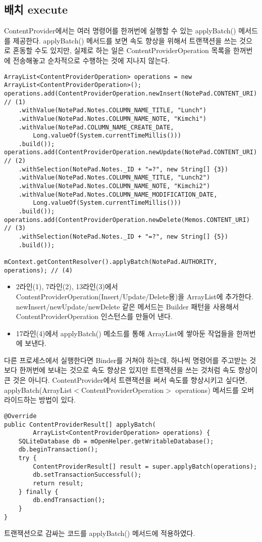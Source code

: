 \subsection{배치 execute}
ContentProvider에서는 여러 명령어를 한꺼번에 실행할 수 있는 applyBatch() 메서드를  제공한다. 
applyBatch() 메서드를 보면 속도 향상을 위해서 트랜잭션을 쓰는 것으로 혼동할 수도 있지만, 실제로 하는 일은 ContentProviderOperation 목록을 한꺼번에 전송해놓고 순차적으로 수행하는 것에 지나지 않는다. 
\begin{lstlisting}[frame=single] 
ArrayList<ContentProviderOperation> operations = new ArrayList<ContentProviderOperation>();
operations.add(ContentProviderOperation.newInsert(NotePad.CONTENT_URI) // (1)
	.withValue(NotePad.Notes.COLUMN_NAME_TITLE, "Lunch")
	.withValue(NotePad.Notes.COLUMN_NAME_NOTE, "Kimchi")
	.withValue(NotePad.COLUMN_NAME_CREATE_DATE, 
		Long.valueOf(System.currentTimeMillis()))
	.build());
operations.add(ContentProviderOperation.newUpdate(NotePad.CONTENT_URI) // (2)
	.withSelection(NotePad.Notes._ID + "=?", new String[] {3})
	.withValue(NotePad.Notes.COLUMN_NAME_TITLE, "Lunch2")
	.withValue(NotePad.Notes.COLUMN_NAME_NOTE, "Kimchi2")
	.withValue(NotePad.Notes.COLUMN_NAME_MODIFICATION_DATE, 
		Long.valueOf(System.currentTimeMillis()))
	.build());
operations.add(ContentProviderOperation.newDelete(Memos.CONTENT_URI) // (3)
	.withSelection(NotePad.Notes._ID + "=?", new String[] {5})
	.build());

mContext.getContentResolver().applyBatch(NotePad.AUTHORITY, operations); // (4)
\end{lstlisting}
\begin{itemize}
\item 2라인(1), 7라인(2), 13라인(3)에서 ContentProviderOperation(Insert/Update/Delete용)을 ArrayList에 추가한다. newInsert/newUpdate/newDelete 같은 메서드는 Builder 패턴을 사용해서 ContentProviderOperation 인스턴스를 만들어 낸다.
\item 17라인(4)에서 applyBatch() 메소드를 통해 ArrayList에 쌓아둔 작업들을 한꺼번에 보낸다.
\end{itemize}

다른 프로세스에서 실행한다면 Binder를 거쳐야 하는데, 하나씩 명령어를 주고받는 것보다 한꺼번에 보내는 것으로 속도 향상은 있지만 트랜잭션을 쓰는 것처럼 속도 향상이 큰 것은 아니다.
ContentProvider에서 트랜잭션을 써서 속도를 향상시키고 싶다면,
applyBatch(ArrayList$<$ContentProviderOperation$>$ operations) 메서드를 오버라이드하는 방법이 있다.
\begin{lstlisting}[frame=single] 
@Override
public ContentProviderResult[] applyBatch(
		ArrayList<ContentProviderOperation> operations) {
	SQLiteDatabase db = mOpenHelper.getWritableDatabase();
	db.beginTransaction();
	try {
     	ContentProviderResult[] result = super.applyBatch(operations);
     	db.setTransactionSuccessful();
     	return result;
   	} finally {
     	db.endTransaction();
   	}
}
\end{lstlisting}
트랜잭션으로 감싸는 코드를 applyBatch() 메서드에 적용하였다.

